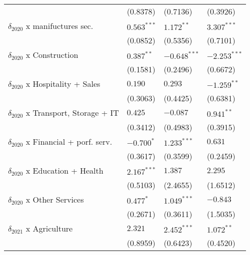 \begin{tabular}{llll}
                                                   &           (0.8378) &           (0.7136) &           (0.3926) \\
$\delta_{2020}$ x manifuctures sec.                &      $0.563^{***}$ &       $1.172^{**}$ &      $3.307^{***}$ \\
                                                   &           (0.0852) &           (0.5356) &           (0.7101) \\
$\delta_{2020}$ x Construction                     &       $0.387^{**}$ &     $-0.648^{***}$ &     $-2.253^{***}$ \\
                                                   &           (0.1581) &           (0.2496) &           (0.6672) \\
$\delta_{2020}$ x Hospitality + Sales              &            $0.190$ &            $0.293$ &      $-1.259^{**}$ \\
                                                   &           (0.3063) &           (0.4425) &           (0.6381) \\
$\delta_{2020}$ x Transport, Storage + IT          &            $0.425$ &           $-0.087$ &       $0.941^{**}$ \\
                                                   &           (0.3412) &           (0.4983) &           (0.3915) \\
$\delta_{2020}$ x Financial + porf. serv.          &         $-0.700^*$ &      $1.233^{***}$ &            $0.631$ \\
                                                   &           (0.3617) &           (0.3599) &           (0.2459) \\
$\delta_{2020}$ x Education + Health               &      $2.167^{***}$ &            $1.387$ &            $2.295$ \\
                                                   &           (0.5103) &           (2.4655) &           (1.6512) \\
$\delta_{2020}$ x Other Services                   &          $0.477^*$ &      $1.049^{***}$ &           $-0.843$ \\
                                                   &           (0.2671) &           (0.3611) &           (1.5035) \\
$\delta_{2021}$ x Agriculture                      &            $2.321$ &      $2.452^{***}$ &       $1.072^{**}$ \\
                                                   &           (0.8959) &           (0.6423) &           (0.4520) \\

\end{tabular}
